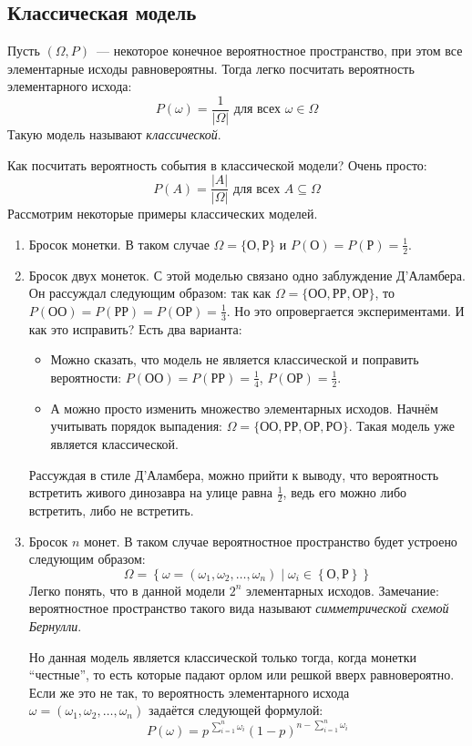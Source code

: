 \documentclass[a4paper,12pt]{article}
\begin{document}
\subsection{Классическая модель}
Пусть \((\Omega, P)\)~--- некоторое конечное вероятностное пространство, при этом все элементарные исходы равновероятны. Тогда легко посчитать вероятность элементарного исхода:
\[P(\omega) = \frac{1}{|\Omega|}\text{ для всех }\omega \in \Omega\]
Такую модель называют \emph{классической}.

Как посчитать вероятность события в классической модели? Очень просто:
\[P(A) = \frac{|A|}{|\Omega|}\text{ для всех }A \subseteq \Omega\]
Рассмотрим некоторые примеры классических моделей.
\begin{enumerate}
	\item Бросок монетки. В таком случае \(\Omega = \{\text{О}, \text{Р}\}\) и \(P(\text{О}) = P(\text{Р}) = \frac{1}{2}\).
	
	\item Бросок двух монеток. С этой моделью связано одно заблуждение Д'Аламбера. Он рассуждал следующим образом: так как \(\Omega = \{\text{ОО}, \text{РР}, \text{ОР}\}\), то \(P(\text{ОО}) = P(\text{РР}) = P(\text{ОР}) = \frac{1}{3}\). Но это опровергается экспериментами. И как это исправить? Есть два варианта:
	\begin{itemize}
		\item Можно сказать, что модель не является классической и поправить вероятности: \(P(\text{ОО}) = P(\text{РР}) = \frac{1}{4}\), \(P(\text{ОР}) = \frac{1}{2}\).
		\item А можно просто изменить множество элементарных исходов. Начнём учитывать порядок выпадения: \(\Omega = \{\text{ОО}, \text{РР}, \text{ОР}, \text{РО}\}\). Такая модель уже является классической.
	\end{itemize}
	Рассуждая в стиле Д'Аламбера, можно прийти к выводу, что вероятность встретить живого динозавра на улице равна \(\frac{1}{2}\), ведь его можно либо встретить, либо не встретить.
	
	\item Бросок \(n\) монет. В таком случае вероятностное пространство будет устроено следующим образом:
	\[\Omega = \left\{\omega = (\omega_1, \omega_2, \ldots, \omega_n) \mid \omega_i \in \left\{\text{О}, \text{Р}\right\}\right\}\]
	Легко понять, что в данной модели \(2^n\) элементарных исходов. Замечание: вероятностное пространство такого вида называют \emph{симметрической схемой Бернулли}.
	
	Но данная модель является классической только тогда, когда монетки ``честные'', то есть которые падают орлом или решкой вверх равновероятно. Если же это не так, то вероятность элементарного исхода \(\omega = (\omega_1, \omega_2, \ldots, \omega_n)\) задаётся следующей формулой:
	\[P(\omega) = p^{\,\sum\limits_{i = 1}^{n} \omega_i}(1 - p)^{n - \sum\limits_{i = 1}^{n} \omega_i}\]
	

\end{enumerate}
\end{document}
